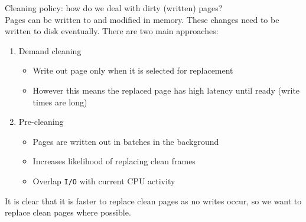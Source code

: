 \documentclass[journal, letterpaper]{IEEEtran}
\begin{document}
\begin{aside}{Cleaning policy: how do we deal with dirty (written) pages?} \\
    Pages can be written to and modified in memory. These changes need to be written to disk eventually. There are two main approaches:
    \begin{enumerate}
        \item Demand cleaning
        \begin{itemize}
            \item Write out page only when it is selected for replacement
            \item However this means the replaced page has high latency until ready (write times are long)
        \end{itemize}
        \item Pre-cleaning
        \begin{itemize}
            \item Pages are written out in batches in the background
            \item Increases likelihood of replacing clean frames
            \item Overlap \verb|I/O| with current CPU activity
        \end{itemize}
    \end{enumerate}
    It is clear that it is faster to replace clean pages as no writes occur, so we want to replace clean pages where possible.
\end{aside}
\end{document}
